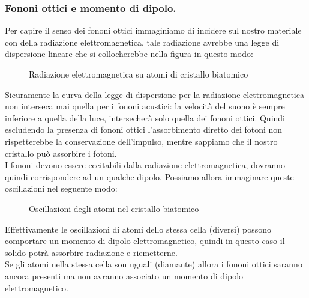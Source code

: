 \subsubsection{Fononi ottici e momento di dipolo.}%
\label{subsub:Fononi ottici e momento di dipolo.}
Per capire il senso dei fononi ottici immaginiamo di incidere sul nostro materiale con della radiazione elettromagnetica, tale radiazione avrebbe una legge di dispersione lineare che si collocherebbe nella figura in questo modo:
\begin{figure}[H]
    \centering
    \caption{Radiazione elettromagnetica su atomi di cristallo biatomico}
    \label{fig:radiazione-elettromagnetica-su-atomi-di-cristallo-biatomico}
\end{figure}
\noindent
Sicuramente la curva della legge di dispersione per la radiazione elettromagnetica non interseca mai quella per i fononi acustici: la velocità del suono è sempre inferiore a quella della luce, intersecherà solo quella dei fononi ottici. 
Quindi escludendo la presenza di fononi ottici l'assorbimento diretto dei fotoni non rispetterebbe la conservazione dell'impulso, mentre sappiamo che il nostro cristallo può assorbire i fotoni.\\
I fononi devono essere eccitabili dalla radiazione elettromagnetica, dovranno quindi corrispondere ad un qualche dipolo. Possiamo allora immaginare queste oscillazioni nel seguente modo:
\begin{figure}[H]
    \centering
    \caption{Oscillazioni degli atomi nel cristallo biatomico}
    \label{fig:oscillazioni-degli-atomi-nel-cristallo-biatomico}
\end{figure}
\noindent
Effettivamente le oscillazioni di atomi dello stessa cella (diversi) possono comportare un momento di dipolo elettromagnetico, quindi in questo caso il solido potrà assorbire radiazione e riemetterne. \\
Se gli atomi nella stessa cella son uguali (diamante) allora i fononi ottici saranno ancora presenti ma non avranno associato un momento di dipolo elettromagnetico.
